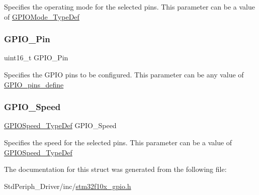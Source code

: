 Specifies the operating mode for the selected pins. This parameter can be a value of \mbox{\hyperlink{group___g_p_i_o___exported___types_ga1347339e1c84a196fabbb31205eec5d4}{G\+P\+I\+O\+Mode\+\_\+\+Type\+Def}} \mbox{\label{struct_g_p_i_o___init_type_def_a0beac3d072f6aaaae29e9e2e400b2f11}} 
\subsubsection{\texorpdfstring{GPIO\_Pin}{GPIO\_Pin}}
{\footnotesize\ttfamily uint16\+\_\+t G\+P\+I\+O\+\_\+\+Pin}

Specifies the G\+P\+IO pins to be configured. This parameter can be any value of \mbox{\hyperlink{group___g_p_i_o__pins__define}{G\+P\+I\+O\+\_\+pins\+\_\+define}} \mbox{\label{struct_g_p_i_o___init_type_def_a57b08335216f50618ebc080e4fbb0a80}} 
\subsubsection{\texorpdfstring{GPIO\_Speed}{GPIO\_Speed}}
{\footnotesize\ttfamily \mbox{\hyperlink{group___g_p_i_o___exported___types_ga062ad92b67b4a1f301c161022cf3ba8e}{G\+P\+I\+O\+Speed\+\_\+\+Type\+Def}} G\+P\+I\+O\+\_\+\+Speed}

Specifies the speed for the selected pins. This parameter can be a value of \mbox{\hyperlink{group___g_p_i_o___exported___types_ga062ad92b67b4a1f301c161022cf3ba8e}{G\+P\+I\+O\+Speed\+\_\+\+Type\+Def}} 

The documentation for this struct was generated from the following file\+:\begin{DoxyCompactItemize}
\item 
Std\+Periph\+\_\+\+Driver/inc/\mbox{\hyperlink{stm32f10x__gpio_8h}{stm32f10x\+\_\+gpio.\+h}}\end{DoxyCompactItemize}
